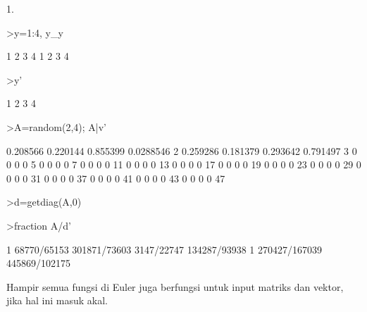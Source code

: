 \documentclass[a4paper,10pt]{article}
\begin{document}
\begin{eulernotebook}
\begin{eulercomment}
\begin{eulercomment}
\begin{eulercomment}
\begin{eulercomment}
\begin{eulercomment}
\begin{eulercomment}
\begin{eulercomment}
\begin{eulercomment}
\begin{eulercomment}
1.
\end{eulercomment}
\begin{eulerprompt}
>y=1:4, y_y
\end{eulerprompt}
\begin{euleroutput}
  [1,  2,  3,  4]
              1             2             3             4 
              1             2             3             4 
\end{euleroutput}
\begin{eulerprompt}
>y'
\end{eulerprompt}
\begin{euleroutput}
              1 
              2 
              3 
              4 
\end{euleroutput}
\begin{eulerprompt}
>A=random(2,4); A|v'
\end{eulerprompt}
\begin{euleroutput}
       0.208566      0.220144      0.855399     0.0288546             2 
       0.259286      0.181379      0.293642      0.791497             3 
              0             0             0             0             5 
              0             0             0             0             7 
              0             0             0             0            11 
              0             0             0             0            13 
              0             0             0             0            17 
              0             0             0             0            19 
              0             0             0             0            23 
              0             0             0             0            29 
              0             0             0             0            31 
              0             0             0             0            37 
              0             0             0             0            41 
              0             0             0             0            43 
              0             0             0             0            47 
\end{euleroutput}
\begin{eulerprompt}
>d=getdiag(A,0)
\end{eulerprompt}
\begin{euleroutput}
  [0.208566,  0.181379]
\end{euleroutput}
\begin{eulerprompt}
>fraction A/d'
\end{eulerprompt}
\begin{euleroutput}
          1 68770/65153 301871/73603 3147/22747 
  134287/93938         1 270427/167039 445869/102175 
\end{euleroutput}
\begin{eulercomment}
Hampir semua fungsi di Euler juga berfungsi untuk input matriks dan
vektor, jika hal ini masuk akal.


\end{eulercomment}
\end{eulercomment}
\end{eulercomment}
\end{eulercomment}
\end{eulercomment}
\end{eulercomment}
\end{eulercomment}
\end{eulercomment}
\end{eulercomment}
\end{eulernotebook}
\end{document}
